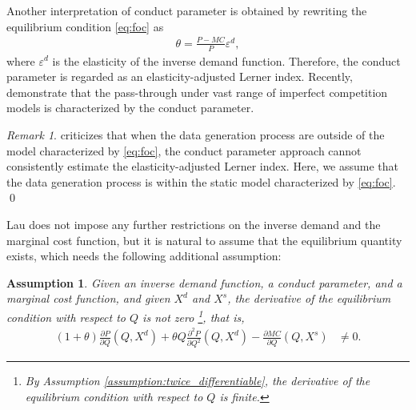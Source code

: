 \documentclass[11pt, a4paper]{article}
\newtheorem{assumption}{Assumption}
\theoremstyle{remark}
\newtheorem{remark}{Remark}
\begin{document}
Another interpretation of conduct parameter is obtained by rewriting the equilibrium condition \eqref{eq:foc} as
\begin{align}
    \theta = \frac{P - MC}{P}\varepsilon^{d},
\end{align}
where $\varepsilon^{d}$ is the elasticity of the inverse demand function.
Therefore, the conduct parameter is regarded as an elasticity-adjusted Lerner index.
Recently, \citet{weylPassThrough2013} demonstrate that the pass-through under vast range of imperfect competition models is characterized by the conduct parameter.

\begin{remark}
    \citet{corts1999conduct} criticizes that when the data generation process are outside of the model characterized by \eqref{eq:foc}, the conduct parameter approach cannot consistently estimate the elasticity-adjusted Lerner index. Here, we assume that the data generation process is within the static model characterized by \eqref{eq:foc}. \qed
\end{remark}


Lau does not impose any further restrictions on the inverse demand and the marginal cost function, but it is natural to assume that the equilibrium quantity exists, which needs the following additional assumption:
\begin{assumption}\label{assumption:unique_equilibrium}
    Given an inverse demand function, a conduct parameter, and a marginal cost function, and given $X^{d}$ and $X^{s}$, the derivative of the equilibrium condition with respect to $Q$ is not zero \footnote{By Assumption \ref{assumption:twice_differentiable}, the derivative of the equilibrium condition with respect to $Q$ is finite.}, that is,
    \begin{align}
        (1+\theta)\frac{\partial P}{\partial Q}(Q, X^{d}) + \theta Q\frac{\partial^2 P}{\partial Q^2}(Q, X^{d}) - \frac{\partial MC}{\partial Q}(Q, X^{s}) & \ne 0.
    \end{align}
\end{assumption}



\end{document}
